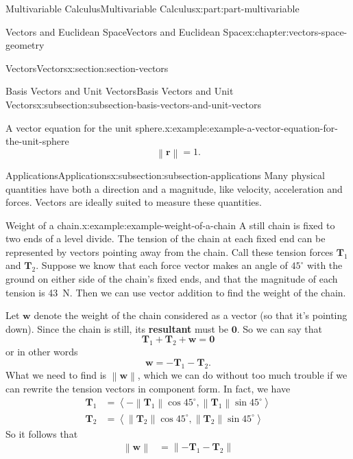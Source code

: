 \documentclass[twoside,10pt,]{tufte-book}
\newcommand{\terminology}[1]{\textbf{#1}}
\numberwithin{equation}{part}
\newcommand{\norm}[1]{\left\| #1 \right\|}
\newcommand{\dotprod}[1]{\left\langle #1 \right\rangle}
\begin{document}
\begin{partptx}{Multivariable Calculus}{}{Multivariable Calculus}{}{}{x:part:part-multivariable}
\begin{chapterptx}{Vectors and Euclidean Space}{}{Vectors and Euclidean Space}{}{}{x:chapter:vectors-space-geometry}
\begin{sectionptx}{Vectors}{}{Vectors}{}{}{x:section:section-vectors}
\begin{subsectionptx}{Basis Vectors and Unit Vectors}{}{Basis Vectors and Unit Vectors}{}{}{x:subsection:subsection-basis-vectors-and-unit-vectors}
\begin{example}{A vector equation for the unit sphere.}{x:example:example-a-vector-equation-for-the-unit-sphere}
\begin{equation*}
\norm{\mathbf{r}} = 1.
\end{equation*}
\end{example}
%
\end{subsectionptx}
%
%
\typeout{************************************************}
\typeout{************************************************}
%
\begin{subsectionptx}{Applications}{}{Applications}{}{}{x:subsection:subsection-applications}
Many physical quantities have both a direction and a magnitude, like velocity, acceleration and forces. Vectors are ideally suited to measure these quantities.%
\begin{example}{Weight of a chain.}{x:example:example-weight-of-a-chain}%
A still chain is fixed to two ends of a level divide. The tension of the chain at each fixed end can be represented by vectors pointing away from the chain. Call these tension forces \(\mathbf{T}_{1}\) and \(\mathbf{T}_{2}\). Suppose we know that each force vector makes an angle of \(45^{\circ}\) with the ground on either side of the chain's fixed ends, and that the magnitude of each tension is \SI{43}{\newton}. Then we can use vector addition to find the weight of the chain.%
\par
Let \(\mathbf{w}\) denote the weight of the chain considered as a vector (so that it's pointing down). Since the chain is still, its \terminology{resultant}\footnotemark{} must be \(\mathbf{0}\). So we can say that%
%
\begin{equation*}
\mathbf{T}_{1}+\mathbf{T}_{2} + \mathbf{w} = \mathbf{0}
\end{equation*}
or in other words%
%
\begin{equation*}
\mathbf{w} = -\mathbf{T}_{1}-\mathbf{T}_{2}.
\end{equation*}
What we need to find is \(\norm{\mathbf{w}}\), which we can do without too much trouble if we can rewrite the tension vectors in component form. In fact, we have%
%
\begin{align*}
\mathbf{T}_{1} & = \dotprod{-\norm{\mathbf{T}_{1}}\cos45^{\circ},\norm{\mathbf{T}_{1}}\sin45^{\circ}} \\
\mathbf{T}_{2} & = \dotprod{\norm{\mathbf{T}_{2}}\cos45^{\circ},\norm{\mathbf{T}_{2}}\sin45^{\circ}} 
\end{align*}
So it follows that%
%
\begin{align*}
\norm{\mathbf{w}} & = \norm{-\mathbf{T}_{1}-\mathbf{T}_{2}} \\

\end{align*}
\end{example}
\end{subsectionptx}
\end{sectionptx}
\end{chapterptx}
\end{partptx}
\end{document}
